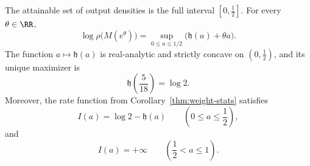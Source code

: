 \begin{theorem}\label{thm:microcanonical-output}
The attainable set of output densities is the full interval \([0,\frac12]\). For every \(\theta\in\RR\),
\begin{equation}\label{eq:microcanonical-legendre}
\log \rho\!\bigl(M(e^\theta)\bigr)
=
\sup_{0\le a\le 1/2}\bigl(\mathfrak h(a)+\theta a\bigr).
\end{equation}
The function \(a\mapsto \mathfrak h(a)\) is real-analytic and strictly concave on \((0,\frac12)\), and its unique maximizer is
\[
\mathfrak h\!\left(\frac{5}{18}\right)=\log 2.
\]
Moreover, the rate function from Corollary~\ref{thm:weight-stats} satisfies
\[
I(a)=\log 2-\mathfrak h(a)\qquad\left(0\le a\le \frac12\right),
\]
and
\[
I(a)=+\infty\qquad\left(\frac12<a\le 1\right).
\]
\end{theorem}

